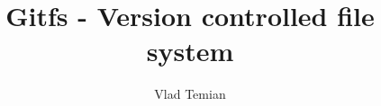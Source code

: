 \documentclass[a4paper,12pt,twoside]{report}
\begin{document}
\title{\LARGE {\bf Gitfs - Version controlled file system }\\
 \vspace*{4mm}
}

\author{Vlad Temian}

\onehalfspacing
\maketitle

\preface




\body







\appendix




\end{document}
